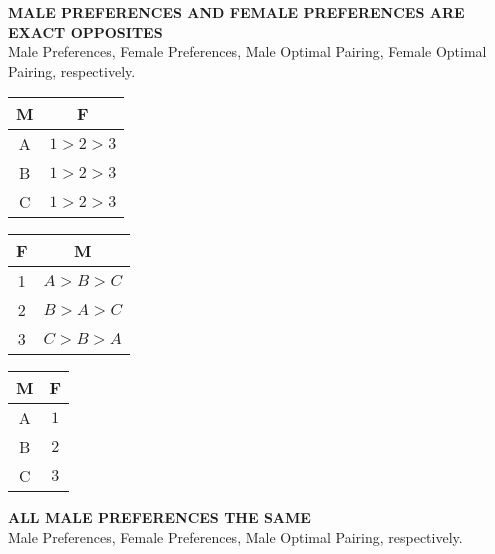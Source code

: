 \documentclass[a4paper]{article}
\begin{document}
\begin{center}
\scriptsize{\textbf{MALE PREFERENCES AND FEMALE PREFERENCES ARE EXACT OPPOSITES}}\\
\scriptsize{Male Preferences, Female Preferences, Male Optimal Pairing, Female Optimal Pairing, respectively.}
\end{center}

\begin{table}[htbp]
    \begin{tabular}[t]{|c|c|}
        \hline
        M & F\\ \hline
        A & $1 > 2 > 3$\\ \hline
        B & $1 > 2 > 3$\\ \hline
        C & $1 > 2 > 3$\\ \hline
    \end{tabular}
    \hfill
    \begin{tabular}[t]{|c|c|}
        \hline
        F & M\\ \hline
        1 & $A > B > C$ \\ \hline
        2 & $B > A > C$\\ \hline  
        3 & $C > B > A$\\ \hline 
    \end{tabular}
    \hfill
    \begin{tabular}[t]{|c|c|}
        \hline
        M & F\\ \hline
        A & $1$\\ \hline
        B & $2$\\ \hline  
        C & $3$\\ \hline 
    \end{tabular}
    \hfill
\end{table}
\begin{center}
\scriptsize{\textbf{ALL MALE PREFERENCES THE SAME}}\\
\scriptsize{Male Preferences, Female Preferences, Male Optimal Pairing, respectively.}
\end{center}

\newpage
\end{document}
